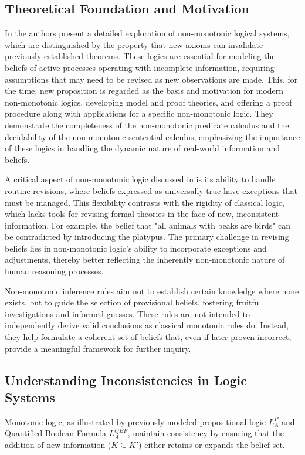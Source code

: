 \subsection{Theoretical Foundation and Motivation}
In \cite{mcdermott_non-monotonic_1980} the authors present a detailed exploration of non-monotonic logical systems, which are distinguished by the property that new axioms can invalidate previously established theorems.
These logics are essential for modeling the beliefs of active processes operating with incomplete information, requiring assumptions that may need to be revised as new observations are made.
This, for the time, new proposition is regarded as the basis and motivation for modern non-monotonic logics, developing model and proof theories, and offering a proof procedure along with applications for a specific non-monotonic logic.
They demonstrate the completeness of the non-monotonic predicate calculus and the decidability of the non-monotonic sentential calculus, emphasizing the importance of these logics in handling the dynamic nature of real-world information and beliefs.

A critical aspect of non-monotonic logic discussed in \cite{mcdermott_non-monotonic_1980} is its ability to handle routine revisions, where beliefs expressed as universally true have exceptions that must be managed.
This flexibility contrasts with the rigidity of classical logic, which lacks tools for revising formal theories in the face of new, inconsistent information.
For example, the belief that "all animals with beaks are birds" can be contradicted by introducing the platypus.
The primary challenge in revising beliefs lies in non-monotonic logic's ability to incorporate exceptions and adjustments, thereby better reflecting the inherently non-monotonic nature of human reasoning processes.

Non-monotonic inference rules aim not to establish certain knowledge where none exists, but to guide the selection of provisional beliefs, fostering fruitful investigations and informed guesses.
These rules are not intended to independently derive valid conclusions as classical monotonic rules do.
Instead, they help formulate a coherent set of beliefs that, even if later proven incorrect, provide a meaningful framework for further inquiry.

\subsection{Understanding Inconsistencies in Logic Systems}
Monotonic logic, as illustrated by previously modeled propositional logic \(L^P_A\) and Quantified Boolean Formula \(L^{QBF}_A\), maintain consistency by ensuring that the addition of new information (\(K \subseteq K'\)) either retains or expands the belief set.

